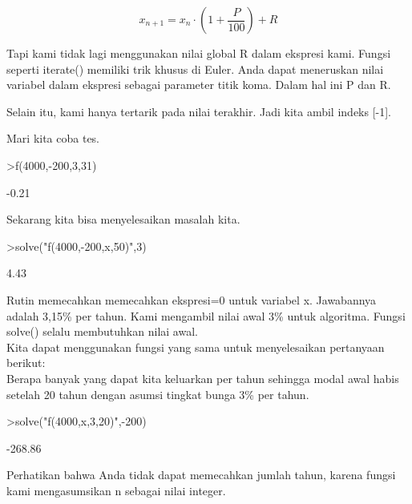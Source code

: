 \documentclass[a4paper,10pt]{article}
\begin{document}
\begin{eulernotebook}
\begin{eulercomment}
\begin{eulercomment}
\begin{eulercomment}
\begin{eulercomment}
\begin{eulercomment}
\end{eulercomment}
\begin{eulerformula}
\[
x_{n+1} = x_n \cdot \left(1+ \frac{P}{100}\right) + R
\]
\end{eulerformula}
\begin{eulercomment}
Tapi kami tidak lagi menggunakan nilai global R dalam ekspresi kami.
Fungsi seperti iterate() memiliki trik khusus di Euler. Anda dapat
meneruskan nilai variabel dalam ekspresi sebagai parameter titik koma.
Dalam hal ini P dan R.

Selain itu, kami hanya tertarik pada nilai terakhir. Jadi kita ambil
indeks [-1].

Mari kita coba tes.
\end{eulercomment}
\begin{eulerprompt}
>f(4000,-200,3,31)
\end{eulerprompt}
\begin{euleroutput}
        -0.21 
\end{euleroutput}
\begin{eulercomment}
Sekarang kita bisa menyelesaikan masalah kita.
\end{eulercomment}
\begin{eulerprompt}
>solve("f(4000,-200,x,50)",3)
\end{eulerprompt}
\begin{euleroutput}
         4.43 
\end{euleroutput}
\begin{eulercomment}
Rutin memecahkan memecahkan ekspresi=0 untuk variabel x. Jawabannya
adalah 3,15\% per tahun. Kami mengambil nilai awal 3\% untuk algoritma.
Fungsi solve() selalu membutuhkan nilai awal.\\
Kita dapat menggunakan fungsi yang sama untuk menyelesaikan pertanyaan
berikut: \\
Berapa banyak yang dapat kita keluarkan per tahun sehingga modal awal
habis setelah 20 tahun dengan asumsi tingkat bunga 3\% per tahun.
\end{eulercomment}
\begin{eulerprompt}
>solve("f(4000,x,3,20)",-200)
\end{eulerprompt}
\begin{euleroutput}
      -268.86 
\end{euleroutput}
\begin{eulercomment}
Perhatikan bahwa Anda tidak dapat memecahkan jumlah tahun, karena
fungsi kami mengasumsikan n sebagai nilai integer.


\end{eulercomment}
\end{eulercomment}
\end{eulercomment}
\end{eulercomment}
\end{eulercomment}
\end{eulernotebook}
\end{document}
